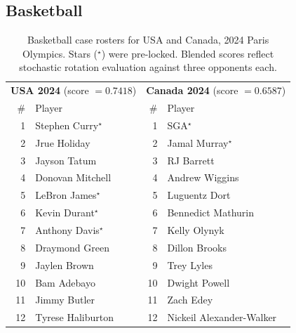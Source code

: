 \documentclass[12pt,letterpaper]{article}
\begin{document}
\subsection{Basketball}

\begin{table}[h]
  \centering
  \caption{Basketball case rosters for USA and Canada, 2024 Paris
    Olympics. Stars ($^{\star}$) were pre-locked. Blended scores reflect
    stochastic rotation evaluation against three opponents each.}
  \label{tab:basketball}
  \small
  \begin{tabular}{r l r l}
    \toprule
    \multicolumn{2}{c}{\textbf{USA 2024} (score $= 0.7418$)} &
    \multicolumn{2}{c}{\textbf{Canada 2024} (score $= 0.6587$)} \\
    \# & Player & \# & Player \\
    \midrule
    1  & Stephen Curry$^{\star}$     & 1  & SGA$^{\star}$ \\
    2  & Jrue Holiday                & 2  & Jamal Murray$^{\star}$ \\
    3  & Jayson Tatum                & 3  & RJ Barrett \\
    4  & Donovan Mitchell            & 4  & Andrew Wiggins \\
    5  & LeBron James$^{\star}$      & 5  & Luguentz Dort \\
    6  & Kevin Durant$^{\star}$      & 6  & Bennedict Mathurin \\
    7  & Anthony Davis$^{\star}$     & 7  & Kelly Olynyk \\
    8  & Draymond Green              & 8  & Dillon Brooks \\
    9  & Jaylen Brown                & 9  & Trey Lyles \\
    10 & Bam Adebayo                 & 10 & Dwight Powell \\
    11 & Jimmy Butler                & 11 & Zach Edey \\
    12 & Tyrese Haliburton           & 12 & Nickeil Alexander-Walker \\
    \bottomrule
  \end{tabular}
\end{table}
\end{document}
